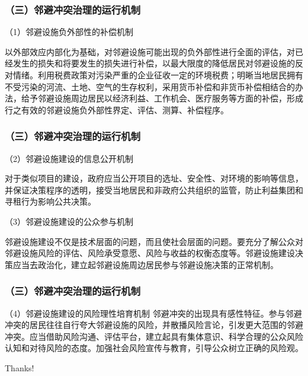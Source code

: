 \documentclass[aspectratio=169, 12pt]{beamer}
\begin{document}
\begin{frame}[plain]
    \frametitle{（三）邻避冲突治理的运行机制}
    （1）邻避设施负外部性的补偿机制
    \par
    以外部效应内部化为基础，对邻避设施可能出现的负外部性进行全面的评估，对已经发生的损失和将要发生的损失进行补偿，以最大限度的降低居民对邻避设施的反对情绪。利用税费政策对污染严重的企业征收一定的环境税费；明晰当地居民拥有不受污染的河流、土地、空气的生存权利，采用货币补偿和非货币补偿相结合的办法，给予邻避设施周边居民以经济利益、工作机会、医疗服务等方面的补偿，形成行之有效的邻避设施负外部性界定、评估、测算、补偿程序。
\end{frame}

\begin{frame}[plain]
    \frametitle{（三）邻避冲突治理的运行机制}
    （2）邻避设施建设的信息公开机制
    \par
      对于类似项目的建设，政府应当公开项目的选址、安全性、对环境的影响等信息，并保证决策程序的透明，接受当地居民和非政府公共组织的监管，防止利益集团和寻租行为影响公共决策。
    \par
      （3）邻避设施建设的公众参与机制
    \par
      邻避设施建设不仅是技术层面的问题，而且使社会层面的问题。要充分了解公众对邻避设施风险的评估、风险承受意愿、风险与收益的权衡态度等。邻避设施建设决策应当去政治化，建立起邻避设施周边居民参与邻避设施决策的正常机制。
\end{frame}

\begin{frame}[plain]
    \frametitle{（三）邻避冲突治理的运行机制}
    （4）邻避设施建设的风险理性培育机制
    邻避冲突的出现具有感性特征。参与邻避冲突的居民往往自行夸大邻避设施的风险，并散播风险言论，引发更大范围的邻避冲突。应当借助风险沟通、评估平台，建立起具有集体意识、科学合理的公众风险认知和对待风险的态度。加强社会风险宣传与教育，引导公众树立正确的风险观。    
\end{frame}

\begin{frame}[standout]
    \begin{center}
        {\Huge\calligra Thanks!}
      \end{center}
\end{frame}
\end{document}
